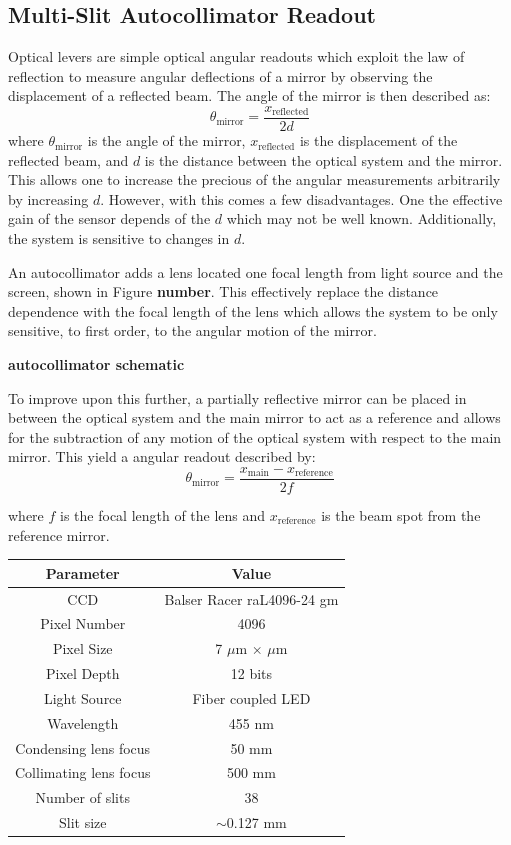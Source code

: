 \documentclass [12pt, proquest]{uwthesis}[2019]
\begin{document}
\subsection{Multi-Slit Autocollimator Readout}

\quad Optical levers are simple optical angular readouts which exploit the law of reflection to measure angular deflections of a mirror by observing the displacement of a reflected beam. The angle of the mirror is then described as:
\begin{equation}
\theta_{\text{mirror}}=\frac{x_{\text{reflected}}}{2d}
\end{equation}
where $\theta_\text{mirror}$ is the angle of the mirror, $x_\text{reflected}$ is the displacement of the reflected beam, and $d$ is the distance between the optical system and the mirror. This allows one to increase the precious of the angular measurements arbitrarily by increasing $d$. However, with this comes a few disadvantages. One the effective gain of the sensor depends of the $d$ which may not be well known. Additionally, the system is sensitive to changes in $d$. 

An autocollimator adds a lens located one focal length from light source and the screen, shown in Figure \textbf{number}. This effectively replace the distance dependence with the focal length of the lens which allows the system to be only sensitive, to first order, to the angular motion of the mirror.

\textbf{autocollimator schematic}

To improve upon this further, a partially reflective mirror can be placed in between the optical system and the main mirror to act as a reference and allows for the subtraction of any motion of the optical system with respect to the main mirror. This yield a angular readout described by:
\begin{equation}
\theta_{\text{mirror}}=\frac{x_{\text{main}}-x_{\text{reference}}}{2f}
\label{ACEq}
\end{equation}

where $f$ is the focal length of the lens and $x_\text{reference}$ is the beam spot from the reference mirror.

\begin{center}
\begin{tabular}{| c | c |}
\hline
Parameter & Value\\
\hline \hline
CCD & Balser Racer raL4096-24 gm\\
Pixel Number & 4096\\
Pixel Size & 7 $\mu$m $\times$  $\mu$m\\
Pixel Depth & 12 bits\\
Light Source & Fiber coupled LED\\
Wavelength & 455 nm\\
Condensing lens focus & 50 mm\\
Collimating lens focus & 500 mm\\
Number of slits & 38\\
Slit size & $\sim$0.127 mm\\
\hline
\end{tabular}
\label{ACTable}
\end{center}
\end{document}
